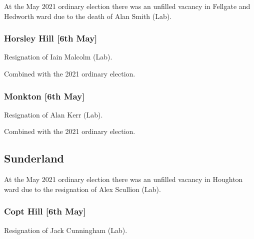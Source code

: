 \documentclass[a4paper,openany]{book}
\begin{document}
\begin{resultsiii}
At the May 2021 ordinary election there was an unfilled vacancy in Fellgate and Hedworth ward due to the death of Alan Smith (Lab).

\subsubsection*{Horsley Hill \hspace*{\fill}\nolinebreak[1]%
	\enspace\hspace*{\fill}
	[6th May]}


Resignation of Iain Malcolm (Lab).

Combined with the 2021 ordinary election.

\subsubsection*{Monkton \hspace*{\fill}\nolinebreak[1]%
	\enspace\hspace*{\fill}
	[6th May]}


Resignation of Alan Kerr (Lab).

Combined with the 2021 ordinary election.

\subsection*{Sunderland}

At the May 2021 ordinary election there was an unfilled vacancy in Houghton ward due to the resignation of Alex Scullion (Lab).

\subsubsection*{Copt Hill \hspace*{\fill}\nolinebreak[1]%
	\enspace\hspace*{\fill}
	[6th May]}


Resignation of Jack Cunningham (Lab).


\end{resultsiii}
\end{document}
